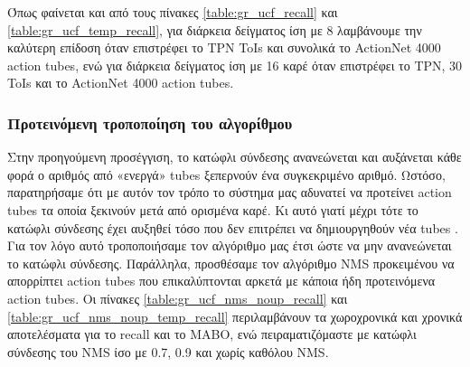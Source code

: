Όπως φαίνεται και από τους πίνακες \ref{table:gr_ucf_recall} και \ref{table:gr_ucf_temp_recall}, για διάρκεια δείγματος ίση με 8 λαμβάνουμε
την καλύτερη επίδοση όταν επιστρέφει το \en TPN  \en ToIs \gr και συνολικά το \en ActionNet  4000  action tubes\gr, ενώ
για διάρκεια δείγματος ίση με 16 καρέ όταν επιστρέφει το \en TPN, 30 ToIs \gr και το \en ActionNet  4000 action tubes.\gr \par

\subsubsection{Προτεινόμενη τροποποίηση του αλγορίθμου}

Στην προηγούμενη προσέγγιση, το κατώφλι σύνδεσης ανανεώνεται και αυξάνεται κάθε φορά ο αριθμός από «ενεργά» \en tubes \gr ξεπερνούν ένα
συγκεκριμένο αριθμό. Ωστόσο, παρατηρήσαμε ότι με αυτόν τον τρόπο το σύστημα μας αδυνατεί να προτείνει \en action tubes \gr τα οποία ξεκινούν
μετά από ορισμένα καρέ. Κι αυτό γιατί μέχρι τότε το κατώφλι σύνδεσης έχει αυξηθεί τόσο που δεν επιτρέπει να δημιουργηθούν νέα \en tubes \gr.
Για τον λόγο αυτό τροποποιήσαμε τον αλγόριθμο μας έτσι ώστε να μην ανανεώνεται το κατώφλι σύνδεσης. Παράλληλα, προσθέσαμε τον αλγόριθμο
\en NMS \gr προκειμένου να απορρίπτει \en action tubes \gr που επικαλύπτονται αρκετά με κάποια ήδη προτεινόμενα \en action tubes\gr.
Οι πίνακες \ref{table:gr_ucf_nms_noup_recall} και  \ref{table:gr_ucf_nms_noup_temp_recall} περιλαμβάνουν τα χωροχρονικά και χρονικά αποτελέσματα
για το \en recall \gr και το \en MABO\gr, ενώ πειραματιζόμαστε με κατώφλι σύνδεσης του \en NMS \gr ίσο με 0.7, 0.9 και χωρίς καθόλου \en
NMS\gr.

